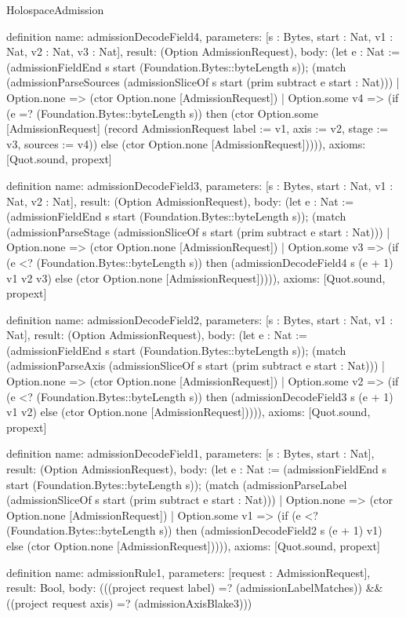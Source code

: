 \begin{lexlean}{HolospaceAdmission}
\begin{semanticmodule}
definition{
  name: admissionDecodeField4,
  parameters: [s : Bytes, start : Nat, v1 : Nat, v2 : Nat, v3 : Nat],
  result: (Option AdmissionRequest),
  body: (let e : Nat := (admissionFieldEnd s start (Foundation.Bytes::byteLength s)); (match (admissionParseSources (admissionSliceOf s start (prim subtract e start : Nat)))
    | Option.none => (ctor Option.none [AdmissionRequest])
    | Option.some v4 => (if (e =? (Foundation.Bytes::byteLength s)) then (ctor Option.some [AdmissionRequest] (record AdmissionRequest {label := v1, axis := v2, stage := v3, sources := v4})) else (ctor Option.none [AdmissionRequest])))),
  axioms: [Quot.sound, propext]
}

definition{
  name: admissionDecodeField3,
  parameters: [s : Bytes, start : Nat, v1 : Nat, v2 : Nat],
  result: (Option AdmissionRequest),
  body: (let e : Nat := (admissionFieldEnd s start (Foundation.Bytes::byteLength s)); (match (admissionParseStage (admissionSliceOf s start (prim subtract e start : Nat)))
    | Option.none => (ctor Option.none [AdmissionRequest])
    | Option.some v3 => (if (e <? (Foundation.Bytes::byteLength s)) then (admissionDecodeField4 s (e + 1) v1 v2 v3) else (ctor Option.none [AdmissionRequest])))),
  axioms: [Quot.sound, propext]
}

definition{
  name: admissionDecodeField2,
  parameters: [s : Bytes, start : Nat, v1 : Nat],
  result: (Option AdmissionRequest),
  body: (let e : Nat := (admissionFieldEnd s start (Foundation.Bytes::byteLength s)); (match (admissionParseAxis (admissionSliceOf s start (prim subtract e start : Nat)))
    | Option.none => (ctor Option.none [AdmissionRequest])
    | Option.some v2 => (if (e <? (Foundation.Bytes::byteLength s)) then (admissionDecodeField3 s (e + 1) v1 v2) else (ctor Option.none [AdmissionRequest])))),
  axioms: [Quot.sound, propext]
}

definition{
  name: admissionDecodeField1,
  parameters: [s : Bytes, start : Nat],
  result: (Option AdmissionRequest),
  body: (let e : Nat := (admissionFieldEnd s start (Foundation.Bytes::byteLength s)); (match (admissionParseLabel (admissionSliceOf s start (prim subtract e start : Nat)))
    | Option.none => (ctor Option.none [AdmissionRequest])
    | Option.some v1 => (if (e <? (Foundation.Bytes::byteLength s)) then (admissionDecodeField2 s (e + 1) v1) else (ctor Option.none [AdmissionRequest])))),
  axioms: [Quot.sound, propext]
}

definition{
  name: admissionRule1,
  parameters: [request : AdmissionRequest],
  result: Bool,
  body: (((project request label) =? (admissionLabelMatches)) && ((project request axis) =? (admissionAxisBlake3)))
}


\end{semanticmodule}
\end{lexlean}
